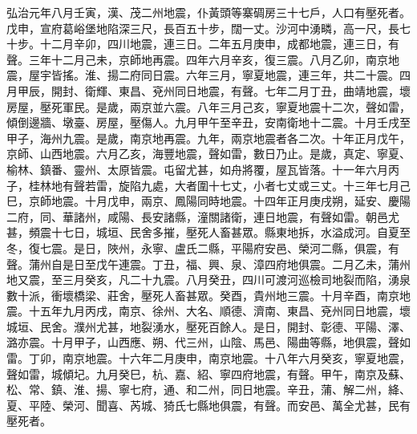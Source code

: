 \begin{pinyinscope}
弘治元年八月壬寅，漢、茂二州地震，仆黃頭等寨碉房三十七戶，人口有壓死者。戊申，宣府葛峪堡地陷深三尺，長百五十步，闊一丈。沙河中湧疄，高一尺，長七十步。十二月辛卯，四川地震，連三日。二年五月庚申，成都地震，連三日，有聲。三年十二月己未，京師地再震。四年六月辛亥，復三震。八月乙卯，南京地震，屋宇皆搖。淮、揚二府同日震。六年三月，寧夏地震，連三年，共二十震。四月甲辰，開封、衛輝、東昌、兗州同日地震，有聲。七年二月丁丑，曲靖地震，壞房屋，壓死軍民。是歲，兩京並六震。八年三月己亥，寧夏地震十二次，聲如雷，傾倒邊牆、墩臺、房屋，壓傷人。九月甲午至辛丑，安南衛地十二震。十月壬戌至甲子，海州九震。是歲，南京地再震。九年，兩京地震者各二次。十年正月戊午，京師、山西地震。六月乙亥，海豐地震，聲如雷，數日乃止。是歲，真定、寧夏、榆林、鎮番、靈州、太原皆震。屯留尤甚，如舟將覆，屋瓦皆落。十一年六月丙子，桂林地有聲若雷，旋陷九處，大者圍十七丈，小者七丈或三丈。十三年七月己巳，京師地震。十月戊申，兩京、鳳陽同時地震。十四年正月庚戌朔，延安、慶陽二府，同、華諸州，咸陽、長安諸縣，潼關諸衛，連日地震，有聲如雷。朝邑尤甚，頻震十七日，城垣、民舍多摧，壓死人畜甚眾。縣東地拆，水溢成河。自夏至冬，復七震。是日，陜州，永寧、盧氏二縣，平陽府安邑、榮河二縣，俱震，有聲。蒲州自是日至戊午連震。丁丑，福、興、泉、漳四府地俱震。二月乙未，蒲州地又震，至三月癸亥，凡二十九震。八月癸丑，四川可渡河巡檢司地裂而陷，湧泉數十派，衝壞橋梁、莊舍，壓死人畜甚眾。癸酉，貴州地三震。十月辛酉，南京地震。十五年九月丙戌，南京、徐州、大名、順德、濟南、東昌、兗州同日地震，壞城垣、民舍。濮州尤甚，地裂湧水，壓死百餘人。是日，開封、彰德、平陽、澤、潞亦震。十月甲子，山西應、朔、代三州，山陰、馬邑、陽曲等縣，地俱震，聲如雷。丁卯，南京地震。十六年二月庚申，南京地震。十八年六月癸亥，寧夏地震，聲如雷，城傾圮。九月癸巳，杭、嘉、紹、寧四府地震，有聲。甲午，南京及蘇、松、常、鎮、淮、揚、寧七府，通、和二州，同日地震。辛丑，蒲、解二州，絳、夏、平陸、榮河、聞喜、芮城、猗氏七縣地俱震，有聲。而安邑、萬全尤甚，民有壓死者。


\end{pinyinscope}
